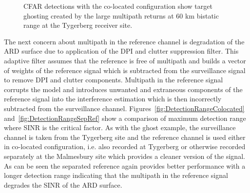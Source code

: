 \documentclass[english, 12pt]{report}
\begin{document}
\begin{figure}[ht]
\centering
{}
\hfill
{}
\caption[CFAR with ghost targets]{CFAR detections with the co-located configuration show target ghosting created by the large multipath returns at 60 km bistatic range at the Tygerberg receiver site.}
\label{fig:MultipathGhostingRemoval}
\end{figure}

The next concern about multipath in the reference channel is degradation of the ARD surface due to application of the DPI and clutter suppression filter. This adaptive filter assumes that the reference is free of multipath and builds a vector of weights of the reference signal which is subtracted from the surveillance signal to remove DPI and clutter components. Multipath in the reference signal corrupts the model and introduces unwanted and extraneous components of the reference signal into the interference estimation which is then incorrectly subtracted from the surveillance channel. Figures~\ref{fig:DetectionRangeColocated} and~\ref{fig:DetectionRangeSepRef} show a comparison of maximum detection range where SINR is the critical factor. As with the ghost example, the surveillance channel is taken from the Tygerberg site and the reference channel is used either in co-located configuration, i.e. also recorded at Tygerberg or otherwise recorded separately at the Malmesbury site which provides a cleaner version of the signal. As can be seen the separated reference again provides better performance with a longer detection range indicating that the multipath in the reference signal degrades the SINR of the ARD surface.
\end{document}
